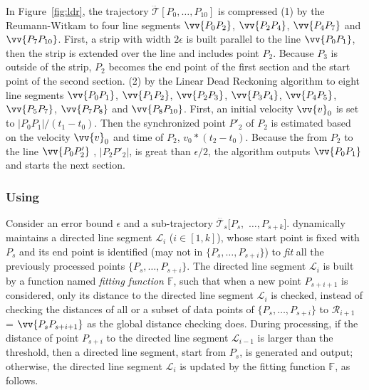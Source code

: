 {\begin{example}
\label{exm-alg-strip}
In Figure~\ref{fig:ldr}, the trajectory $\dddot{\mathcal{T}}[P_0, \ldots, P_{10}]$ is compressed
%
(1) by the Reumann-Witkam to four line segments $\vv{P_0P_2}$, $\vv{P_2P_4}$, $\vv{P_4P_7}$ and $\vv{P_7P_{10}}$. First, a strip with width $2\epsilon$ is built parallel to the line $\vv{P_0P_1}$, then the strip is extended over the line and includes point $P_2$. Because $P_3$ is outside of the strip, $P_2$ becomes the end point of the first section and the start point of the second section.
%
(2) by the Linear Dead Reckoning algorithm to eight line segments $\vv{P_0P_1}$, $\vv{P_1P_2}$, $\vv{P_2P_3}$, $\vv{P_3P_4}$, $\vv{P_4P_5}$, $\vv{P_5P_7}$, $\vv{P_7P_8}$ and $\vv{P_8P_{10}}$. First, an initial velocity ${\vv{v}_0}$ is set to $|P_0P_1|/(t_1-t_0)$. Then the synchronized point $P'_2$ of $P_2$ is estimated based on the velocity ${\vv{v}_0}$ and time of $P_2$, \ie ${v}_0 * (t_2-t_0)$. Because the \sed from $P_2$ to the line $\vv{P_0P'_2}$ , \ie $|P_2P'_2|$, is great than $\epsilon/2$, the algorithm outputs $\vv{P_0P_1}$ and starts the next section.
\end{example}

}%

\subsubsection{\operb Using \ped}
\label{sec-operb}


Consider an error bound $\epsilon$ and a sub-trajectory $\dddot{\mathcal{T}_s}[P_s,$ $\ldots, P_{s+k}]$.
\operb dynamically maintains a directed line segment $\mathcal{L}_i$ ($i\in[1,k]$), whose start point is fixed with $P_s$ and its end point is identified (may not in $\{P_s, \ldots, P_{s+i}\}$) to {\em fit} all the previously processed points $\{P_s, \ldots, P_{s+i}\}$.
The directed line segment $\mathcal{L}_i$ is built by a function named \emph{fitting function $\mathbb{F}$}, such that when a new point $P_{s+i+1}$ is considered, only its distance to the directed line segment $\mathcal{L}_i$ is checked, instead of checking the distances of all or a subset of data points of $\{P_{s}, \ldots, P_{s+i}\}$ to $\mathcal{R}_{i+1}$ = $\vv{P_sP_{s+i+1}}$ as the global distance checking does.
During processing, if the distance of point $P_{s+i}$ to the directed line segment $\mathcal{L}_{i-1}$ is larger than the threshold, then a directed line segment, start from $P_s$, is generated and output;
otherwise, the directed line segment $\mathcal{L}_i$ is updated by the fitting function $\mathbb{F}$, as follows.

